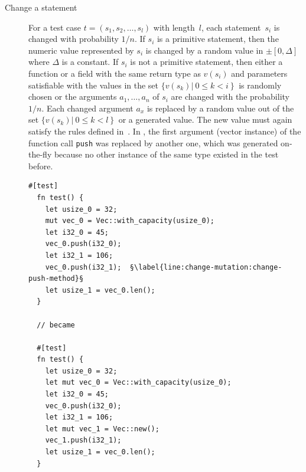 \documentclass[paper=a4,%
  twoside,%
  BCOR4mm,%
  abstract=true,%
  toc=bibliography,%
  chapterprefix=true,%
  toc=bibliographynumbered,%
  open=right,%
  english,%
  pagesize=pdftex]{scrreprt}
\begin{document}
\begin{description}
  \item[Change a statement] For a test case $t = (s_1, s_2, \dots, s_l)$ with length~$l$, each statement~$s_i$ is changed with probability $1/n$. If $s_i$ is a primitive statement, then the numeric value represented by $s_i$ is changed by a random value in $\pm[0,\Delta]$ where $\Delta$ is a constant. If $s_i$ is not a primitive statement, then either a function or a field with the same return type as $v(s_i)$ and parameters satisfiable with the values in the set $\{v(s_k) \left|~0 \leq k < i \right\}$ is randomly chosen or the arguments $a_1, \dots, a_n$ of $s_i$ are changed with the probability $1/n$. Each changed argument $a_x$ is replaced by a random value out of the set $\{v(s_k) \left|~0 \leq k < l \right\}$ or a generated value. The new value must again satisfy the rules defined in~. In , the first argument (vector instance) of the function call \texttt{push} was replaced by another one, which was generated on-the-fly because no other instance of the same type existed in the test before.

  \begin{lstlisting}[style=boxed, label=lst:mutation-input-value, caption={The first argument (which effectively is the function owner) of the call to \emph{push} in~Line~\ref{line:change-mutation:change-push-method} has been changed to a newly created value \emph{vec\string_1}}, escapechar=§]
  #[test]
  fn test() {
    let usize_0 = 32;
    mut vec_0 = Vec::with_capacity(usize_0);
    let i32_0 = 45;
    vec_0.push(i32_0);
    let i32_1 = 106;
    vec_0.push(i32_1);  §\label{line:change-mutation:change-push-method}§
    let usize_1 = vec_0.len();
  }

  // became

  #[test]
  fn test() {
    let usize_0 = 32;
    let mut vec_0 = Vec::with_capacity(usize_0);
    let i32_0 = 45;
    vec_0.push(i32_0);
    let i32_1 = 106;
    let mut vec_1 = Vec::new();
    vec_1.push(i32_1);
    let usize_1 = vec_0.len();
  }
  \end{lstlisting}


\end{description}
\end{document}
